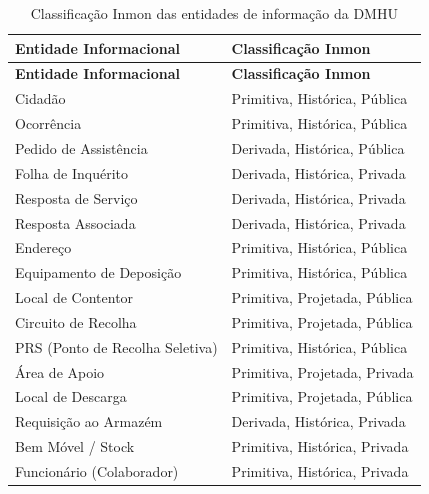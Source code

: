 \documentclass[12pt,a4paper,final]{article}
\begin{document}
    \renewcommand{\arraystretch}{1.3}
    \begin{longtable}{|p{6cm}|p{7cm}|}
        \caption{Classificação Inmon das entidades de informação da DMHU}
        \label{tab:inmon} \\
        \hline
        \textbf{Entidade Informacional}          & \textbf{Classificação Inmon}    \\
        \hline
        \endfirsthead
        \hline
        \textbf{Entidade Informacional}          & \textbf{Classificação Inmon}    \\
        \hline
        \endhead
        \hline
        \endfoot


        Cidadão                                  & Primitiva, Histórica, Pública   \\
        Ocorrência                               & Primitiva, Histórica, Pública   \\
        Pedido de Assistência                    & Derivada, Histórica, Pública    \\
        Folha de Inquérito                       & Derivada, Histórica, Privada    \\
        Resposta de Serviço                      & Derivada, Histórica, Privada    \\
        Resposta Associada                       & Derivada, Histórica, Privada    \\
        Endereço                                 & Primitiva, Histórica, Pública   \\
        Equipamento de Deposição                 & Primitiva, Histórica, Pública   \\
        Local de Contentor                       & Primitiva, Projetada, Pública   \\
        Circuito de Recolha                      & Primitiva, Projetada, Pública   \\
        PRS (Ponto de Recolha Seletiva)          & Primitiva, Histórica, Pública   \\
        Área de Apoio                            & Primitiva, Projetada, Privada   \\
        Local de Descarga                        & Primitiva, Projetada, Pública   \\
        Requisição ao Armazém                    & Derivada, Histórica, Privada    \\
        Bem Móvel / Stock                        & Primitiva, Histórica, Privada   \\
        Funcionário (Colaborador)                & Primitiva, Histórica, Privada   \\

\end{longtable}
\end{document}
